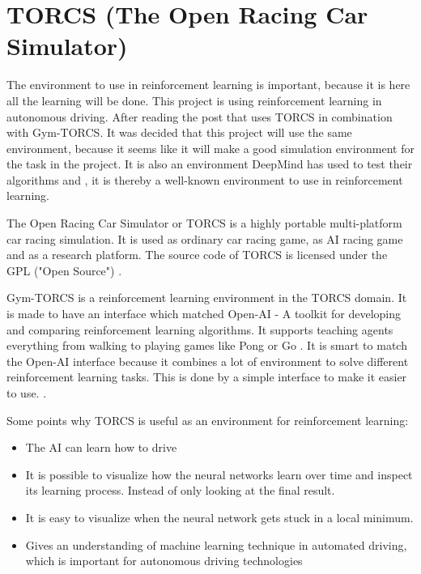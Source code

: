\section{TORCS (The Open Racing Car Simulator)}
\label{sec:TORCS}
The environment to use in reinforcement learning is important, because it is here all the learning will be done. This project is using reinforcement learning in autonomous driving. After reading the post \cite{DDPG_Torcs} that uses TORCS in combination with Gym-TORCS. It was decided that this project will use the same environment, because it seems like it will make a good simulation environment for the task in the project. It is also an environment DeepMind has used to test their algorithms \cite{DBLP:journals/corr/LillicrapHPHETS15} and \cite{DBLP:journals/corr/MnihBMGLHSK16}, it is thereby a well-known environment to use in reinforcement learning. 

The Open Racing Car Simulator or TORCS is a highly portable multi-platform car racing simulation. It is used as ordinary car racing game, as AI racing game and as a research platform. The source code of TORCS is licensed under the GPL ("Open Source") \cite{TORCS_website}. 

Gym-TORCS is a reinforcement learning environment in the TORCS domain. It is made to have an interface which matched Open-AI - A toolkit for developing and comparing reinforcement learning algorithms. It supports teaching agents everything from walking to playing games like Pong or Go \cite{OPENAI_website}. It is smart to match the Open-AI interface because it combines a lot of environment to solve different reinforcement learning tasks. This is done by a simple interface to make it easier to use. \cite{Gym_TORCS_website}. 

Some points why TORCS is useful as an environment for reinforcement learning:
\begin{itemize}
	\item The AI can learn how to drive
	\item It is possible to visualize how the neural networks learn over time and inspect its learning process. Instead of only looking at the final result.
	\item It is easy to visualize when the neural network gets stuck in a local minimum.
	\item Gives an understanding of machine learning technique in automated driving, which is important for autonomous driving technologies 
\end{itemize}

